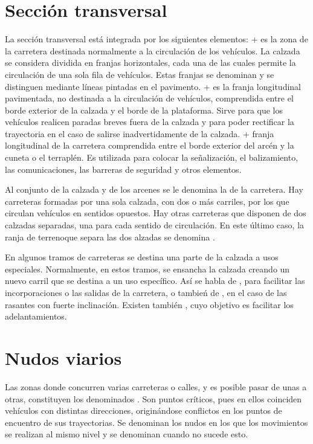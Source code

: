 \documentclass[letterpaper,10pt,english]{sphinxmanual}
\let\sphinxpxdimen\pdfpxdimen\else\newdimen\sphinxpxdimen
\begin{document}
\section{Sección transversal}
\label{\detokenize{trazado:seccion-transversal}}
La sección transversal está integrada por los siguientes elementos:
+  es la zona de la carretera destinada normalmente a la circulación de los vehículos. La calzada se considera dividida en franjas horizontales, cada una de las cuales permite la circulación de una sola fila de vehículos. Estas franjas se denominan  y se distinguen mediante líneas pintadas en el pavimento.
+  es la franja longitudinal pavimentada, no destinada a la circulación de vehículos, comprendida entre el borde exterior de la calzada y el borde de la plataforma. Sirve para que los vehículos realicen paradas breves fuera de la calzada y para poder rectificar la trayectoria en el caso de salirse inadvertidamente de la calzada.
+  franja longitudinal de la carretera comprendida entre el borde exterior del arcén y la cuneta o el terraplén. Es utilizada para colocar la señalización, el balizamiento, las comunicaciones, las barreras de seguridad y otros elementos.

Al conjunto de la calzada y de los arcenes se le denomina la  de la carretera. Hay carreteras formadas por una sola calzada, con dos o más carriles, por los que circulan vehículos en sentidos opuestos. Hay otras carreteras que disponen de dos calzadas separadas, una para cada sentido de circulación. En este último caso, la ranja de terrenoque separa las dos alzadas se denomina .

En algunos tramos de carreteras se destina una parte de la calzada a usos especiales. Normalmente, en estos tramos, se ensancha la calzada creando un nuevo carril que se destina a un uso específico. Así se habla de , para facilitar las incorporaciones o las salidas de la carretera, o tambień de , en el caso de las rasantes con fuerte inclinación. Existen también , cuyo objetivo es facilitar los adelantamientos.

\noindent\sphinxincludegraphics[width=900\sphinxpxdimen]{{Seccion}.png}


\section{Nudos viarios}
\label{\detokenize{trazado:nudos-viarios}}
Las zonas donde concurren varias carreteras o calles, y es posible pasar de unas a otras, constituyen los denominados . Son puntos críticos, pues en ellos coinciden vehículos con distintas direcciones, originándose conflictos en los puntos de encuentro de sus trayectorias. Se denominan  los nudos en los que los movimientos se realizan al mismo nivel y se denominan  cuando no sucede esto.
\end{document}
